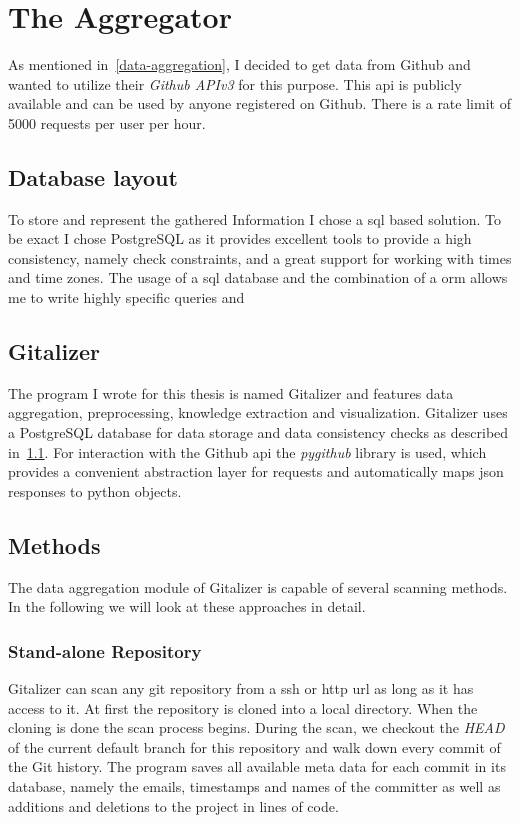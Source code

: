 \chapter{The Aggregator}\label{aggregator}
As mentioned in~\ref{data-aggregation}, I decided to get data from Github and wanted to utilize their \emph{Github APIv3} for this purpose.
This \ac{api} is publicly available and can be used by anyone registered on Github.
There is a rate limit of 5000 requests per user per hour.


\section{Database layout}\label{data-structure}
To store and represent the gathered Information I chose a \ac{sql} based solution. To be exact I chose PostgreSQL as it provides excellent tools to provide a high consistency, namely check constraints, and a great support for working with times and time zones.
The usage of a \ac{sql} database and the combination of a \ac{orm} allows me to write highly specific queries and


\section{Gitalizer}
The program I wrote for this thesis is named Gitalizer and features data aggregation, preprocessing, knowledge extraction and visualization.
Gitalizer uses a PostgreSQL database for data storage and data consistency checks as described in~\ref{data-structure}.
For interaction with the Github \ac{api} the \emph{pygithub} library is used, which provides a convenient abstraction layer for requests and automatically maps \ac{json} responses to python objects.


\section{Methods}
The data aggregation module of Gitalizer is capable of several scanning methods. In the following we will look at these approaches in detail.

\subsection{Stand-alone Repository}\label{stand-alone-repository-scan}
Gitalizer can scan any git repository from a \ac{ssh} or \ac{http} \acs{url} as long as it has access to it.
At first the repository is cloned into a local directory.
When the cloning is done the scan process begins.
During the scan, we checkout the \emph{HEAD} of the current default branch for this repository and walk down every commit of the Git history.
The program saves all available meta data for each commit in its database, namely the emails, timestamps and names of the committer as well as additions and deletions to the project in lines of code.

